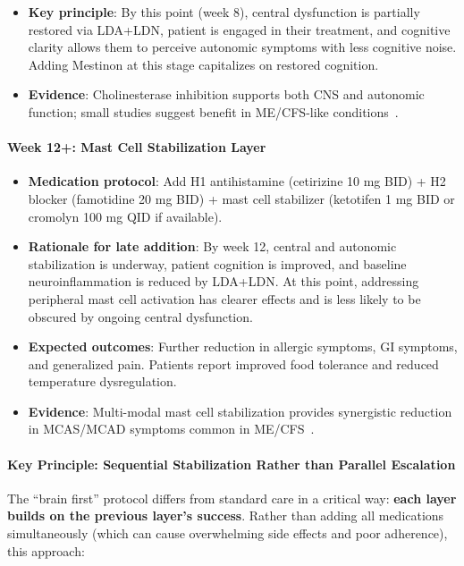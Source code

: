 \begin{protocol}
\begin{itemize}
    \item \textbf{Key principle}: By this point (week 8), central dysfunction is partially restored via LDA+LDN, patient is engaged in their treatment, and cognitive clarity allows them to perceive autonomic symptoms with less cognitive noise. Adding Mestinon at this stage capitalizes on restored cognition.

    \item \textbf{Evidence}: Cholinesterase inhibition supports both CNS and autonomic function; small studies suggest benefit in ME/CFS-like conditions~\cite{MCMC2024Neurometabolic}.
\end{itemize}

\paragraph{Week 12+: Mast Cell Stabilization Layer}

\begin{itemize}
    \item \textbf{Medication protocol}: Add H1 antihistamine (cetirizine 10 mg BID) + H2 blocker (famotidine 20 mg BID) + mast cell stabilizer (ketotifen 1 mg BID or cromolyn 100 mg QID if available).

    \item \textbf{Rationale for late addition}: By week 12, central and autonomic stabilization is underway, patient cognition is improved, and baseline neuroinflammation is reduced by LDA+LDN. At this point, addressing peripheral mast cell activation has clearer effects and is less likely to be obscured by ongoing central dysfunction.

    \item \textbf{Expected outcomes}: Further reduction in allergic symptoms, GI symptoms, and generalized pain. Patients report improved food tolerance and reduced temperature dysregulation.

    \item \textbf{Evidence}: Multi-modal mast cell stabilization provides synergistic reduction in MCAS/MCAD symptoms common in ME/CFS~\cite{NIH2024MECFSRoadmap}.
\end{itemize}

\paragraph{Key Principle: Sequential Stabilization Rather than Parallel Escalation}

The ``brain first'' protocol differs from standard care in a critical way: \textbf{each layer builds on the previous layer's success}. Rather than adding all medications simultaneously (which can cause overwhelming side effects and poor adherence), this approach:


\end{protocol}
